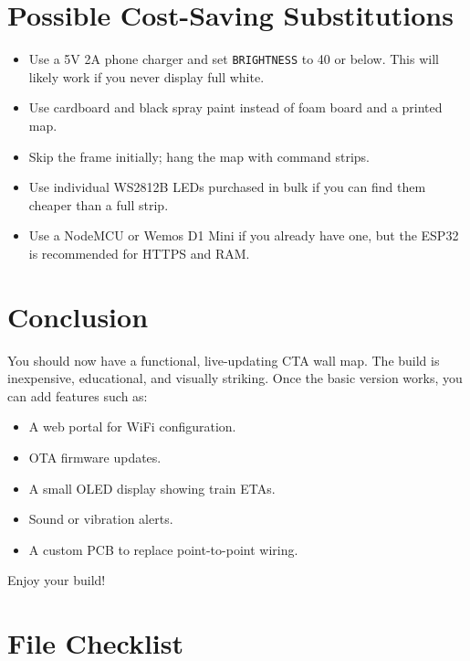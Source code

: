 \documentclass[11pt]{article}
\begin{document}
\section{Possible Cost-Saving Substitutions}

\begin{itemize}
    \item Use a 5V 2A phone charger and set \texttt{BRIGHTNESS} to 40 or below. This will likely work if you never display full white.
    \item Use cardboard and black spray paint instead of foam board and a printed map.
    \item Skip the frame initially; hang the map with command strips.
    \item Use individual WS2812B LEDs purchased in bulk if you can find them cheaper than a full strip.
    \item Use a NodeMCU or Wemos D1 Mini if you already have one, but the ESP32 is recommended for HTTPS and RAM.
\end{itemize}

\section{Conclusion}

You should now have a functional, live-updating CTA wall map. The build is inexpensive, educational, and visually striking. Once the basic version works, you can add features such as:

\begin{itemize}
    \item A web portal for WiFi configuration.
    \item OTA firmware updates.
    \item A small OLED display showing train ETAs.
    \item Sound or vibration alerts.
    \item A custom PCB to replace point-to-point wiring.
\end{itemize}

Enjoy your build!

\appendix

\section{File Checklist}
\end{document}
